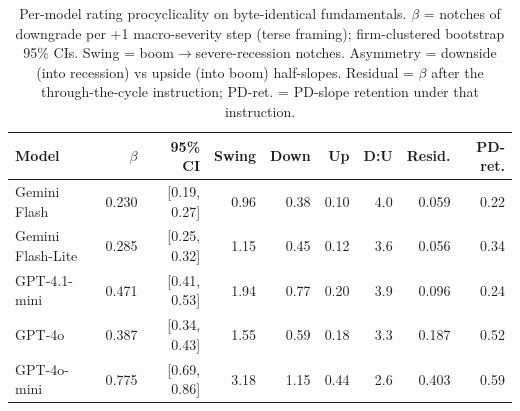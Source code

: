 \begin{table}[t]
\centering
\caption{Per-model rating procyclicality on byte-identical fundamentals. $\beta$ = notches of downgrade per +1 macro-severity step (terse framing); firm-clustered bootstrap 95\% CIs. Swing = boom$\to$severe-recession notches. Asymmetry = downside (into recession) vs upside (into boom) half-slopes. Residual = $\beta$ after the through-the-cycle instruction; PD-ret. = PD-slope retention under that instruction.}
\label{tab:permodel}
\begin{tabular}{lrrrrrrrr}
\toprule
Model & $\beta$ & 95\% CI & Swing & Down & Up & D:U & Resid. & PD-ret. \\
\midrule
Gemini Flash & 0.230 & [0.19, 0.27] & 0.96 & 0.38 & 0.10 & 4.0 & 0.059 & 0.22 \\
Gemini Flash-Lite & 0.285 & [0.25, 0.32] & 1.15 & 0.45 & 0.12 & 3.6 & 0.056 & 0.34 \\
GPT-4.1-mini & 0.471 & [0.41, 0.53] & 1.94 & 0.77 & 0.20 & 3.9 & 0.096 & 0.24 \\
GPT-4o & 0.387 & [0.34, 0.43] & 1.55 & 0.59 & 0.18 & 3.3 & 0.187 & 0.52 \\
GPT-4o-mini & 0.775 & [0.69, 0.86] & 3.18 & 1.15 & 0.44 & 2.6 & 0.403 & 0.59 \\
\bottomrule
\end{tabular}
\end{table}